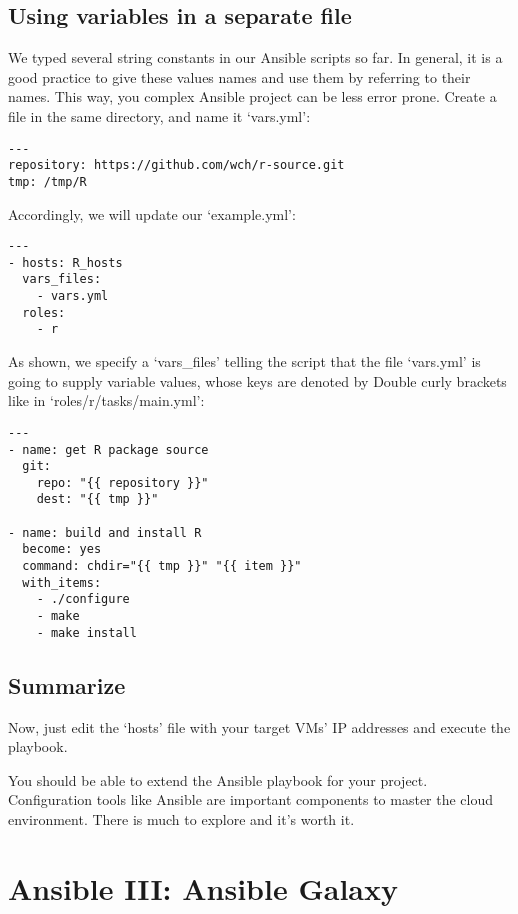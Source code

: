 \subsection{Using variables in a separate
file}\label{using-variables-in-a-separate-file}

We typed several string constants in our Ansible scripts so far. In
general, it is a good practice to give these values names and use them
by referring to their names. This way, you complex Ansible project can
be less error prone. Create a file in the same directory, and name it
`vars.yml':

\begin{verbatim}
---
repository: https://github.com/wch/r-source.git
tmp: /tmp/R
\end{verbatim}

Accordingly, we will update our `example.yml':

\begin{verbatim}
---
- hosts: R_hosts
  vars_files:
    - vars.yml
  roles:
    - r
\end{verbatim}

As shown, we specify a `vars_files' telling the script that the file
`vars.yml' is going to supply variable values, whose keys are denoted by
Double curly brackets like in `roles/r/tasks/main.yml':

\begin{verbatim}
---
- name: get R package source
  git:
    repo: "{{ repository }}"
    dest: "{{ tmp }}"

- name: build and install R
  become: yes
  command: chdir="{{ tmp }}" "{{ item }}"
  with_items:
    - ./configure
    - make
    - make install
\end{verbatim}

\subsection{Summarize}\label{summarize}

Now, just edit the `hosts' file with your target VMs' IP addresses and
execute the playbook.

You should be able to extend the Ansible playbook for your project.
Configuration tools like Ansible are important components to master the
cloud environment. There is much to explore and it's worth it.
\section{Ansible III: Ansible Galaxy}\label{ansible-iii-ansible-galaxy}

